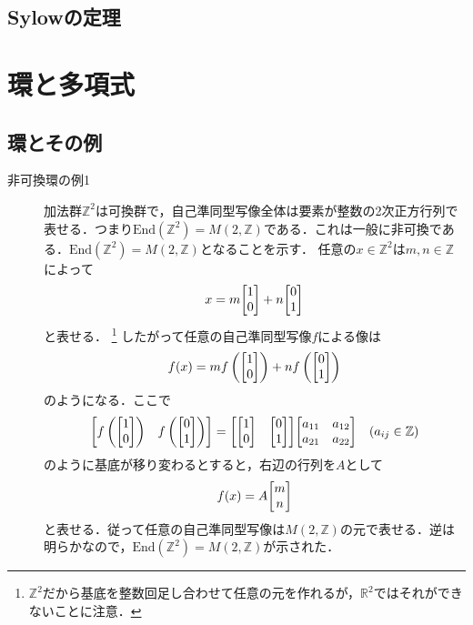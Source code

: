 \documentclass[a4paper,10pt,uplatex]{jsarticle}
\newcommand{\R}{\mathbb{R}}
\newcommand{\Z}{\mathbb{Z}}
\newcommand{\End}{\text{End}}
\numberwithin{equation}{section}
\theoremstyle{mystyle}
\begin{document}
\subsection{Sylowの定理}

\section{環と多項式}
\subsection{環とその例}
\begin{description}
    \item[非可換環の例1] 加法群$\Z^2$は可換群で，自己準同型写像全体は要素が整数の2次正方行列で表せる．つまり$\End(\Z^2) = M(2,\Z)$である．これは一般に非可換である．$\End(\Z^2) = M(2,\Z)$となることを示す．
    任意の$x \in \Z^2$は$m,n \in \Z$によって
    \begin{equation}
        x = m\mqty[1\\0] + n\mqty[0\\1]
    \end{equation}
    と表せる．
    \footnote{$\Z^2$だから基底を整数回足し合わせて任意の元を作れるが，$\R^2$ではそれができないことに注意．}
    したがって任意の自己準同型写像$f$による像は
    \begin{equation}
        f(x) = mf\left(\mqty[1\\0]\right) + nf\left(\mqty[0\\1]\right)
    \end{equation}
    のようになる．ここで
    \begin{equation}
        \mqty[f\left(\mqty[1\\0]\right) & f\left(\mqty[0\\1]\right)] = \mqty[\mqty[1\\0] & \mqty[0\\1]]\mqty[\xmat*{a}{2}{2}] \quad (a_{ij} \in \Z)
    \end{equation}
    のように基底が移り変わるとすると，右辺の行列を$A$として
    \begin{equation}
        f(x) = A\mqty[m\\n]
    \end{equation}
    と表せる．従って任意の自己準同型写像は$M(2,\Z)$の元で表せる．逆は明らかなので，$\End(\Z^2) = M(2,\Z)$が示された．
\end{description}
\end{document}
